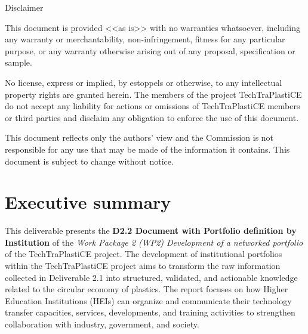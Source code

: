 \documentclass[
  12pt,
  oneside]{book}
\renewcommand*\contentsname{Table of contents}
\newcommand\contentsname{Table of contents}
\begin{document}
\begin{frontmatter}
\begin{titlepage}
  \vfill


  

    
    
    \vfill
    
    {\scriptsize\centering\color{lightgray} 
    
    Disclaimer
    
    This document is provided <<as is>> with no warranties whatsoever, 
    including any warranty or merchantability, non-infringement, fitness for any particular 
    purpose, or any warranty otherwise arising out of any proposal, specification or sample.  
    
    No license, express or implied, by estoppels or otherwise, to any intellectual 
    property rights are granted herein. 
    The members of the project TechTraPlastiCE do not accept any liability for actions or 
    omissions of TechTraPlastiCE members or third parties and disclaim any obligation 
    to enforce the use of this document. 
    
    This document reflects only the authors' view and the Commission is not responsible 
    for any use that may be made of the information it contains.  
    This document is subject to change without notice. 
    
    }
    \normalsize
    
    
    
      \end{titlepage}
  \end{frontmatter}

\renewcommand*\contentsname{Contents}
{
\setcounter{tocdepth}{2}
\tableofcontents
}
\listoffigures
\listoftables

\mainmatter
\chapter*{Executive summary}\label{executive-summary}

This deliverable presents the \textbf{D2.2 Document with Portfolio
definition by Institution} of the \emph{Work Package 2 (WP2) Development
of a networked portfolio} of the TechTraPlastiCE project. The
development of institutional portfolios within the TechTraPlastiCE
project aims to transform the raw information collected in Deliverable
2.1 into structured, validated, and actionable knowledge related to the
circular economy of plastics. The report focuses on how Higher Education
Institutions (HEIs) can organize and communicate their technology
transfer capacities, services, developments, and training activities to
strengthen collaboration with industry, government, and society.
\end{document}
